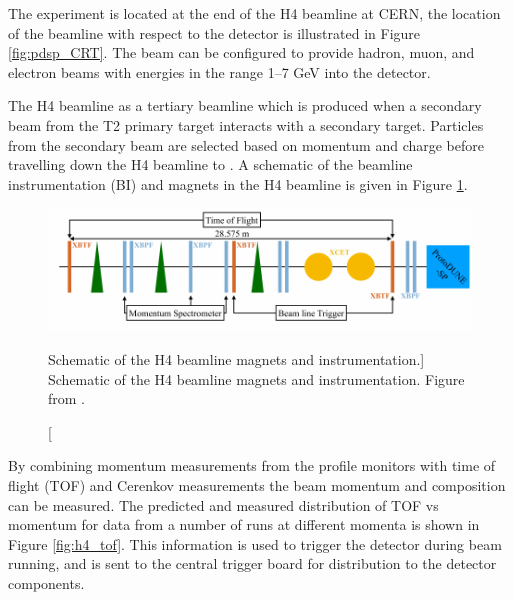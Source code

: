 The \protodune{} experiment is located at the end of the H4 beamline at CERN,
the location of the beamline with respect to the detector is illustrated in
Figure \ref{fig:pdsp_CRT}.  The beam can be configured to provide hadron, 
muon, and electron beams with energies in the range 1--7 GeV into the 
detector. 

The H4 beamline as a tertiary beamline which is produced when a secondary beam
from the T2 primary target interacts with a secondary target. Particles from the
secondary beam are selected based on momentum and charge before travelling down
the H4 beamline to \protodune{}. A schematic of the beamline instrumentation
(BI) and magnets in the H4 beamline is given in Figure \ref{fig:h4_schem}. 

\begin{figure}

	\centering

	\includegraphics[width=\textwidth]{figures/h4_schem.pdf}

	\caption
	[Schematic of the H4 beamline magnets and instrumentation.]
	{Schematic of the H4 beamline magnets and instrumentation. Figure from
	\cite{protoduneperf}.}

	\label{fig:h4_schem}

\end{figure}

By combining momentum measurements from the profile monitors with time of flight
(TOF) and Cerenkov measurements the beam momentum and composition can be 
measured. The predicted and measured distribution of TOF vs momentum for data 
from a number of runs at different momenta is shown in Figure \ref{fig:h4_tof}.
This information is used to trigger the detector during beam running, and is
sent to the central trigger board for distribution to the detector components.


